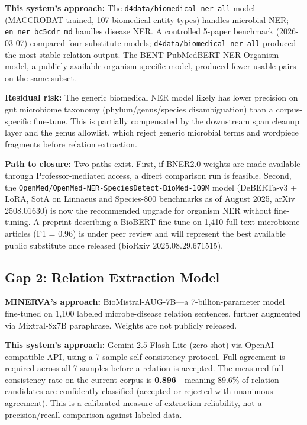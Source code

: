 \documentclass[12pt, letterpaper]{article}
\begin{document}
\textbf{This system's approach:} The \texttt{d4data/biomedical-ner-all} model (MACCROBAT-trained, 107 biomedical entity types) handles microbial NER; \texttt{en\_ner\_bc5cdr\_md} handles disease NER. A controlled 5-paper benchmark (2026-03-07) compared four substitute models; \texttt{d4data/biomedical-ner-all} produced the most stable relation output. The BENT-PubMedBERT-NER-Organism model, a publicly available organism-specific model, produced fewer usable pairs on the same subset.

\textbf{Residual risk:} The generic biomedical NER model likely has lower precision on gut microbiome taxonomy (phylum/genus/species disambiguation) than a corpus-specific fine-tune. This is partially compensated by the downstream span cleanup layer and the genus allowlist, which reject generic microbial terms and wordpiece fragments before relation extraction.

\textbf{Path to closure:} Two paths exist. First, if BNER2.0 weights are made available through Professor-mediated access, a direct comparison run is feasible. Second, the \texttt{OpenMed/OpenMed-NER-SpeciesDetect-BioMed-109M} model (DeBERTa-v3 + LoRA, SotA on Linnaeus and Species-800 benchmarks as of August 2025, arXiv 2508.01630) is now the recommended upgrade for organism NER without fine-tuning. A preprint describing a BioBERT fine-tune on 1,410 full-text microbiome articles (F1 = 0.96) is under peer review and will represent the best available public substitute once released (bioRxiv 2025.08.29.671515).

\subsection{Gap 2: Relation Extraction Model}

\textbf{MINERVA's approach:} BioMistral-AUG-7B—a 7-billion-parameter model fine-tuned on 1,100 labeled microbe-disease relation sentences, further augmented via Mixtral-8x7B paraphrase. Weights are not publicly released.

\textbf{This system's approach:} Gemini 2.5 Flash-Lite (zero-shot) via OpenAI-compatible API, using a 7-sample self-consistency protocol. Full agreement is required across all 7 samples before a relation is accepted. The measured full-consistency rate on the current corpus is \textbf{0.896}—meaning 89.6\% of relation candidates are confidently classified (accepted or rejected with unanimous agreement). This is a calibrated measure of extraction reliability, not a precision/recall comparison against labeled data.
\end{document}
